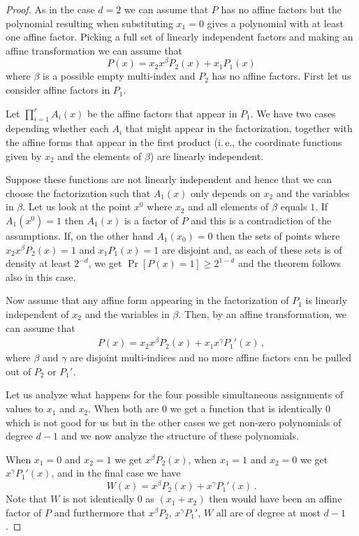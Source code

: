 \documentclass[10pt]{article}
\theoremstyle{definition}
\numberwithin{equation}{section}
\begin{document}
\begin{proof}
As in the case $d=2$ we can assume that $P$
has no affine factors but the polynomial resulting
when substituting $x_1=0$ gives a polynomial
with at least one affine factor.  Picking
a full set of linearly independent factors
and making an affine transformation we can
assume that
$$
P(x)=x_2 x^\beta P_2(x)+ x_1 P_1(x)$$
where $\beta$ is a  possible empty multi-index and
$P_2$ has no affine factors. First
let us consider affine factors in $P_1$.  

Let $\prod_{i=1}^r A_i(x)$ be the affine
factors that appear in $P_1$.  We have two
cases depending whether each $A_i$ that might appear
in the factorization, together with the
affine forms that appear in the first product
(i.\,e., the coordinate functions given by $x_2$
and the elements of $\beta$) are linearly independent.

Suppose these functions are not linearly independent and hence that
we can choose the factorization such
that $A_1(x)$ only depends
on $x_2$ and the variables in $\beta$.  Let
us look at the point $x^0$ where $x_2$ and all
elements of $\beta$ equals $1$.  If $A_1(x^0)=1$
then $A_1(x)$ is a factor of $P$
and this is a contradiction of the assumptions.
If, on the other hand $A_1(x_0)=0$ then the sets of points
where $x_2 x^\beta P_2(x)=1$ and $x_1 P_1(x)=1$
are disjoint and, as each of these sets is of density
at least $2^{-d}$,  we get $\Pr[P(x)=1] \geq 2^{1-d}$ and the
theorem follows also in this case.

Now assume that any affine form  appearing in the factorization
of $P_1$ is linearly independent of $x_2$ and the variables
in $\beta$.  Then, by an affine transformation,
we can assume that 
\begin{eqnarray}
P(x)=x_2 x^\beta P_2(x)+ x_1 x^\gamma P_1'(x)\,,
\end{eqnarray}
where $\beta$ and $\gamma$ are disjoint
multi-indices and no more affine factors
can be pulled out of $P_2$ or $P_1'$.

Let us analyze what happens for
the four possible simultaneous assignments
of values to $x_1$ and $x_2$.
When both are 0 we get a function that is
identically 0 which is not good for us
but in the other cases we get non-zero polynomials
of degree $d-1$ and we now analyze the 
structure of these polynomials.

When $x_1=0$ and $x_2=1$
we get $x^\beta P_2(x)$, when
$x_1=1$ and $x_2=0$ we get
$x^\gamma P_1'(x)$, and in the final
case we have
$$
W(x)=x^\beta P_2(x)+ x^\gamma P_1'(x)\,.$$
Note that $W$ is not identically 0
as $(x_1+x_2)$ then would have been
an affine factor of $P$ and furthermore that
$x^{\beta}P_2$, $x^{\gamma}P_1'$, $W$ all are of degree at
most $d-1$.


\end{proof}
\end{document}
